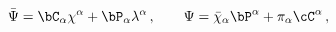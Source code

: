 \begin{equation}
  \bar\Psi=\bC_\alpha \chi^\alpha+\bP_\alpha \lambda^\alpha\,, \qquad
  \Psi=\bar\chi_\alpha \bP^\alpha +\pi_\alpha \cC^\alpha\,,
\end{equation}

